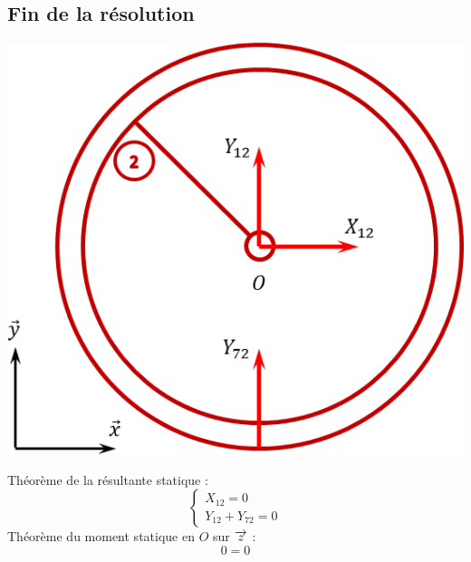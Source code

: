 \documentclass[11pt,oneside]{article}
\begin{document}
\subsection*{Fin de la résolution}


\begin{exemple}
\begin{minipage}[c]{.3\linewidth}
\begin{center}
\includegraphics[width=.9\textwidth]{png/2}
\end{center}
\end{minipage}\hfill
\begin{minipage}[c]{.65\linewidth}
Théorème de la résultante statique : 
$$
\left\{
\begin{array}{l}
X_{12}=0 \\
Y_{12}+Y_{72}=0 
\end{array}
\right.
$$
Théorème du moment statique en $O$ sur $\overrightarrow{z}$ : 
$$
0=0
$$
\end{minipage}


\end{exemple}
\end{document}
